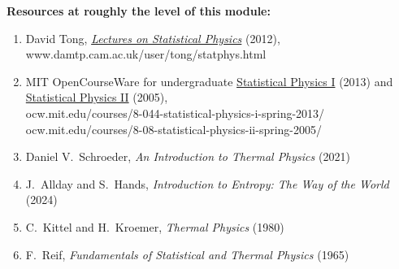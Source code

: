 \noindent\textbf{Resources at roughly the level of this module:} \\[-24 pt]
\begin{enumerate}
  \item David Tong, \href{https://www.damtp.cam.ac.uk/user/tong/statphys.html}{\textit{Lectures on Statistical Physics}} (2012), \\ www.damtp.cam.ac.uk/user/tong/statphys.html
  \item MIT OpenCourseWare for undergraduate \href{https://ocw.mit.edu/courses/8-044-statistical-physics-i-spring-2013/}{Statistical Physics I} (2013) and \href{https://ocw.mit.edu/courses/8-08-statistical-physics-ii-spring-2005/}{Statistical Physics II} (2005), \\ ocw.mit.edu/courses/8-044-statistical-physics-i-spring-2013/ \\ ocw.mit.edu/courses/8-08-statistical-physics-ii-spring-2005/
  \item Daniel V.~Schroeder, \textit{An Introduction to Thermal Physics} (2021)
  \item J.~Allday and S.~Hands, \textit{Introduction to Entropy: The Way of the World} (2024)
  \item C.~Kittel and H.~Kroemer, \textit{Thermal Physics} (1980)
  \item F.~Reif, \textit{Fundamentals of Statistical and Thermal Physics} (1965)
\end{enumerate}

